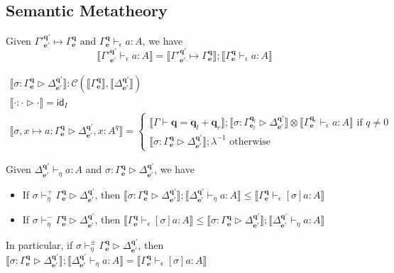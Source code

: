 \documentclass[acmsmall,screen,review]{acmart}
\newcommand{\mc}[1]{\ensuremath{\mathcal{#1}}}
\newcommand{\mb}[1]{\ensuremath{\mathbf{#1}}}
\newcommand{\ms}[1]{\ensuremath{\mathsf{#1}}}
\newcommand{\qsp}[4]{#1 \vdash #2 = #3 + #4}
\newcommand{\cwk}[2]{#1 \mapsto #2}
\newcommand{\hasty}[4]{#1 \vdash_{#2} #3: {#4}}
\newcommand{\issubst}[3]{#1: #2 \rhd #3}
\newcommand{\csubst}[5]{#1 \vdash_{#4}^{#5} #2 \rhd #3}
\newcommand{\dnt}[1]{\llbracket{#1}\rrbracket}
\begin{document}
\subsection{Semantic Metatheory}

\begin{lemma}
  Given $\cwk{\Gamma'^{\mb{q}'}_{\mb{e}'}}{\Gamma^{\mb{q}}_{\mb{e}}}$ and
  $\hasty{\Gamma^{\mb{q}}_{\mb{e}}}{\epsilon}{a}{A}$, we have
  \begin{equation*}
    \dnt{\hasty{\Gamma'^{\mb{q}'}_{\mb{e}'}}{\epsilon}{a}{A}}
    = \dnt{\cwk{\Gamma'^{\mb{q}'}_{\mb{e}'}}{\Gamma^{\mb{q}}_{\mb{e}}}}
    ; \dnt{\hasty{\Gamma^{\mb{q}}_{\mb{e}}}{\epsilon}{a}{A}}
  \end{equation*}
\end{lemma}

\begin{gather*}
  \boxed{\dnt{\issubst{\sigma}{\Gamma^{\mb{q}}_{\mb{e}}}{\Delta^{\mb{q}'}_{\mb{e}'}}}
    : \mc{C}(\dnt{\Gamma^{\mb{q}}_{\mb{e}}}, \dnt{\Delta^{\mb{q}'}_{\mb{e}'}})} \\
  \dnt{\issubst{\cdot}{\cdot}{\cdot}} = \ms{id}_I
  \\
  \dnt{\issubst{\sigma, x \mapsto a}{\Gamma^{\mb{q}}_{\mb{e}}}{\Delta^{\mb{q}'}_{\mb{e}'}, x : A^q}}
  = \begin{cases}
    \dnt{\qsp{\Gamma}{\mb{q}}{\mb{q}_l}{\mb{q}_r}} 
    ; \dnt{\issubst{\sigma}{\Gamma^{\mb{q}_l}_{\mb{e}_l}}{\Delta^{\mb{q}'}_{\mb{e}'}}}
    \otimes \dnt{\hasty{\Gamma^{\mb{q}_r}_{\mb{e}}}{\epsilon}{a}{A}}
    \text{ if } q \neq 0 \\
    \dnt{\issubst{\sigma}{\Gamma^{\mb{q}}_{\mb{e}}}{\Delta^{\mb{q}'}_{\mb{e}'}}}
    ; \lambda^{-1} \text{ otherwise}
  \end{cases}
\end{gather*}

\begin{lemma}
  Given 
  $\hasty{\Delta^{\mb{q}'}_{\mb{e}'}}{\eta}{a}{A}$ and 
  $\issubst{\sigma}{\Gamma^{\mb{q}}_{\mb{e}}}{\Delta^{\mb{q}'}_{\mb{e}'}}$, we have
  \begin{itemize}
    \item If $\csubst{\sigma}{\Gamma^{\mb{q}}_{\mb{e}}}{\Delta^{\mb{q}'}_{\mb{e}'}}{\eta}{+}$, then
    $
    \dnt{\issubst{\sigma}{\Gamma^{\mb{q}}_{\mb{e}}}{\Delta^{\mb{q}'}_{\mb{e}'}}}
    ; \dnt{\hasty{\Delta^{\mb{q}'}_{\mb{e}'}}{\eta}{a}{A}}
    \leq \dnt{\hasty{\Gamma^{\mb{q}}_{\mb{e}}}{\epsilon}{[\sigma]a}{A}}
    $
    \item If $\csubst{\sigma}{\Gamma^{\mb{q}}_{\mb{e}}}{\Delta^{\mb{q}'}_{\mb{e}'}}{\eta}{-}$, then
    $
    \dnt{\hasty{\Gamma^{\mb{q}}_{\mb{e}}}{\epsilon}{[\sigma]a}{A}}
    \leq \dnt{\issubst{\sigma}{\Gamma^{\mb{q}}_{\mb{e}}}{\Delta^{\mb{q}'}_{\mb{e}'}}}
    ; \dnt{\hasty{\Delta^{\mb{q}'}_{\mb{e}'}}{\eta}{a}{A}}
    $
  \end{itemize}
  In particular, if 
  $\csubst{\sigma}{\Gamma^{\mb{q}}_{\mb{e}}}{\Delta^{\mb{q}'}_{\mb{e}'}}{\eta}{\pm}$, then
  $
  \dnt{\issubst{\sigma}{\Gamma^{\mb{q}}_{\mb{e}}}{\Delta^{\mb{q}'}_{\mb{e}'}}}
  ; \dnt{\hasty{\Delta^{\mb{q}'}_{\mb{e}'}}{\eta}{a}{A}}
  = \dnt{\hasty{\Gamma^{\mb{q}}_{\mb{e}}}{\epsilon}{[\sigma]a}{A}}
  $
\end{lemma}
\end{document}
